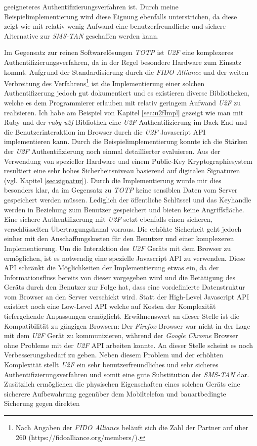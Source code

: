 \documentclass[11pt,a4paper,ngerman]{scrreprt}
\begin{document}
geeigneteres Authentifizierungsverfahren ist. Durch meine Beispielimplementierung wird diese Eignung ebenfalls unterstrichen, da diese zeigt wie mit relativ wenig Aufwand eine benutzerfreundliche und sichere Alternative zur \textit{SMS-TAN} geschaffen werden kann.

Im Gegensatz zur reinen Softwarelösungen \textit{TOTP} ist \textit{U2F} eine komplexeres Authentifizierungsverfahren, da in der Regel besondere Hardware zum Einsatz kommt. Aufgrund der Standardisierung durch die \textit{FIDO Alliance} und der weiten Verbreitung des Verfahrens\footnote{Nach Angaben der \textit{FIDO Alliance} beläuft sich die Zahl der Partner auf über 260 (https://fidoalliance.org/members/).} ist die Implementierung einer solchen Authentifizerung jedoch gut dokumentiert und es existieren diverse Bibliotheken, welche es dem Programmierer erlauben mit relativ geringem Aufwand \textit{U2F} zu realisieren. Ich habe am Beispiel von Kapitel \ref{sec:u2fImpl} gezeigt wie man mit Ruby und der \textit{ruby-u2f} Bibliothek eine \textit{U2F} Authentifizierung im Back-End und die Benutzerinteraktion im Browser durch die \textit{U2F} Javascript API implementieren kann. Durch die Beispielimplementierung konnte ich die Stärken der \textit{U2F} Authentifizierung noch einmal detaillierter evaluieren. Aus der Verwendung von spezieller Hardware und einem Public-Key Kryptographiesystem resultiert eine sehr hohes Sicherheitsniveau basierend auf digitalen Signaturen (vgl. Kapitel \ref{sec:signatur}). Durch die Implementierung wurde mir dies besonders klar, da im Gegensatz zu \textit{TOTP} keine sensiblen Daten vom Server gespeichert werden müssen. Lediglich der öffentliche Schlüssel und das Keyhandle werden in Beziehung zum Benutzer gespeichert und bieten keine Angriffsfläche. Eine sichere Authentifizerung mit \textit{U2F} setzt ebenfalls einen sicheren, verschlüsselten Übertragungskanal vorraus. Die erhöhte Sicherheit geht jedoch einher mit den Anschaffungskosten für den Benutzer und einer komplexeren Implementierung. Um die Interaktion des \textit{U2F} Geräts mit dem Browser zu ermöglichen, ist es notwendig eine spezielle Javascript API zu verwenden. Diese API schränkt die Möglichkeiten der Implementierung etwas ein, da der Informationsfluss bereits von dieser vorgegeben wird und die Betätigung des Geräts durch den Benutzer zur Folge hat, dass eine vordefinierte Datenstruktur vom Browser an den Server verschickt wird. Statt der High-Level Javascript API existiert noch eine Low-Level API welche auf Kosten der Komplexität tiefergehende Anpassungen ermöglicht. Erwähnenswert an dieser Stelle ist die Kompatibilität zu gängigen Browsern: Der \textit{Firefox} Browser war nicht in der Lage mit dem \textit{U2F} Gerät zu kommunizieren, während der \textit{Google Chrome} Browser ohne Probleme mit der \textit{U2F} API arbeiten konnte. An dieser Stelle scheint es noch Verbesserungsbedarf zu geben. Neben diesem Problem und der erhöhten Komplexität stellt \textit{U2F} ein sehr benutzerfreundliches und sehr sicheres Authentifizierungsverfahren und somit eine gute Substitution der \textit{SMS-TAN} dar. Zusätzlich ermöglichen die physischen Eigenschaften eines solchen Geräts eine sicherere Aufbewahrung gegenüber dem Mobiltelefon und bauartbedingte Sicherung gegen direkten 
\end{document}
